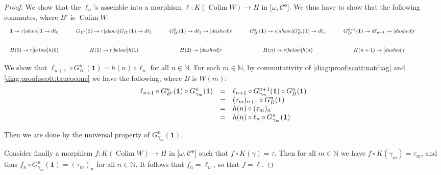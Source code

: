 \documentclass[%
  a4paper,
  UKenglish,
  cleveref,
  autoref,
  thm-restate,
  numberwithinsect,
]{lipics-v2021}
\newcommand\NN{\mathbb{N}}
\newcommand\one{\mathbf{1}}	%
\newcommand\cat\mathcal
\newcommand\comp{\mathbin\circ}
\newcommand\funct[1]{\lbrack #1 \rbrack}
\newcommand\Colim{\mathop{\mathrm{Colim}}}
\newcommand\arrow\to
\newcommand\ep{{\mathbf{e}}}
\begin{document}
\begin{proof}
We show that the $\ell_n$'s assemble into a morphism
$\ell \colon K(\Colim W) \to H$ in $\funct{\omega,\cat C^\ep}$.
We thus have to show that the following commutes,
where $B'$ is $\Colim W$:
\begin{equation*}
\begin{array}{c}
\begin{tikzcd} %
%
  \one
  \arrow{r}[above]{\one}
  \arrow{d}{\ell_0}
& G_{B'}(\one)
  \arrow{r}[above]{G_{B'}(\one)}
  \arrow{d}{\ell_1}
& G^2_{B'}(\one)
  \arrow{d}{\ell_2}
  \arrow[dashed]{r}
& G^n_{B'}(\one)
  \arrow{r}[above]{G_{B'}^n(\one)}
  \arrow{d}{\ell_n}
& G^{n+1}_{B'}(\one)
  \arrow{d}{\ell_{n+1}}
  \arrow[dashed]{r}
& \phantom{F}
%
\\
%
  H(0)
  \arrow{r}[below]{h(0)}
& H(1)
  \arrow{r}[below]{h(1)}
& H(2)
  \arrow[dashed]{r}
& H(n)
  \arrow{r}[below]{h(n)}
& H(n+1)
  \arrow[dashed]{r}
& \phantom{F}
%
\end{tikzcd}
\end{array}
\end{equation*}

We show that $\ell_{n+1} \comp G_{B'}^n(\one) = h(n) \comp \ell_n$
for all $n \in \NN$.
For each $m \in \NN$, 
by commutativity of \eqref{diag:proof:scott:natdiag}
and \eqref{diag:proof:scott:taucocone}
we have the following, where $B$ is $W(m)$:
\[
\begin{array}{l l l}
  \ell_{n+1} \comp G_{B'}^{n}(\one) \comp G_{\gamma_m}^{n}(\one)
& =
& \ell_{n+1} \comp G_{\gamma_m}^{n+1}(\one) \comp G_B^{n}(\one)
\\
%
& =
& (\tau_m)_{n+1} \comp G_B^{n}(\one)
\\
%
& =
& h(n) \comp (\tau_m)_n
\\
%
& =
& h(n) \comp \ell_n \comp G_{\gamma_m}^n(\one)
\end{array}
\]

\noindent
Then we are done by the universal property of $G_{\gamma_m}^n(\one)$.

Consider finally a morphism $f \colon K(\Colim W) \to H$ in
$\funct{\omega,\cat C^\ep}$
such that $f \comp K(\gamma) = \tau$.
Then for all $m \in \NN$ we have
$f \comp K(\gamma_m) = \tau_m$,
and thus
$f_n \comp G_{\gamma_m}^n(\one) = (\tau_m)_n$
for all $n \in \NN$.
It follows that $f_n = \ell_n$, so that $f = \ell$.
\end{proof}
\end{document}
